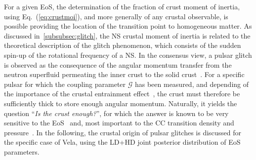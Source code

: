 For a given EoS, the determination of the fraction of crust moment of inertia,
using Eq.~(\ref{eq:crustmoi}), 
and more generally of any crustal observable, is possible providing 
the location of the transition point to homogeneous matter.
As discussed in~\ref{subsubsec:glitch}, the NS crustal moment of inertia is
related to the theoretical description of the glitch phenomenon, which consists
of the sudden spin-up of the rotational frequency of a NS. In the consensus 
view, a pulsar glitch is observed as the consequence of the angular 
momentum transfer from the neutron superfluid permeating the inner crust to the 
solid crust~\cite{Anderson1975}. For a specific pulsar for which the coupling 
parameter $\mathcal{G}$ has been measured, and depending of the importance of 
the crustal entrainment effect~\cite{Chamel2013}, the crust must therefore be 
sufficiently thick to store enough angular momentum. Naturally, it yields the 
question ``\textit{Is the crust enough?}'', for which the answer is known to be 
very sensitive to the EoS~\cite{Andersson2012,Piekarewicz2014} and, most 
important to the CC transition density and pressure~\cite{Carreau2019moi}. In 
the following, the crustal origin of pulsar glitches is discussed for the 
specific case of Vela, using the LD+HD joint posterior distribution of EoS 
parameters.

